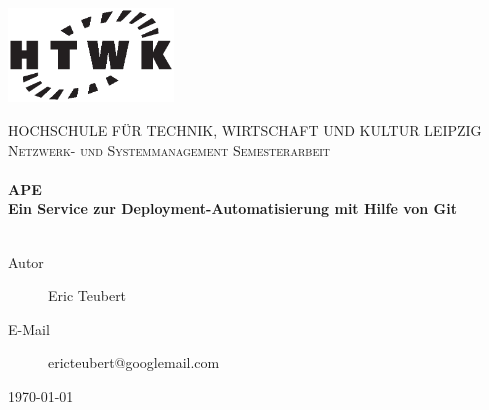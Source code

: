 \begin{titlepage}

  \begin{center}

    \thispagestyle{empty} 

    \includegraphics[height=25mm]{assets/HTWK.eps}

    \textsc{\LARGE HOCHSCHULE FÜR TECHNIK, WIRTSCHAFT UND KULTUR LEIPZIG}\\[1cm]

    \textsc{\LARGE \color{grey} Netzwerk- und Systemmanagement Semesterarbeit}\\[1cm]

    \HRule \\[0.4cm]
      {
        \huge \bfseries APE \\[0.4cm]
        \large Ein Service zur Deployment-Automatisierung mit Hilfe von Git
      }\\[0.4cm]
    \HRule \\[1.5cm]

    \begin{minipage}{0.85\textwidth}
      \begin{flushleft}
        \color{grey}
        \begin{description}
          \item [Autor]         \hfill Eric Teubert
          \item [E-Mail]        \hfill ericteubert@googlemail.com
        \end{description}
      \end{flushleft}
    \end{minipage}

    \vfill
    {\large \today}

  \end{center}
\end{titlepage}